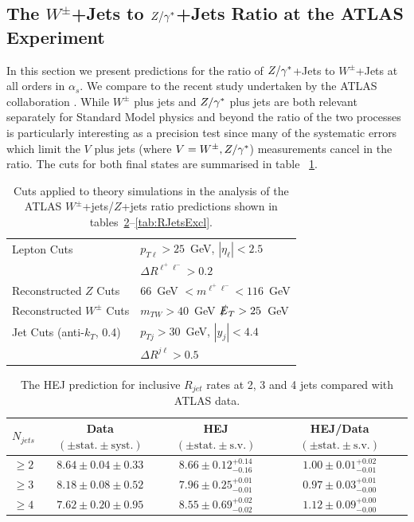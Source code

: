 	\subsection{The $W^\pm$+Jets to $Z/\gamma^*$+Jets Ratio at the ATLAS Experiment}
		\label{sub:ATLASZsec}

		In this section we present predictions for the ratio of $Z/\gamma^*$+Jets to
		$W^\pm$+Jets at all orders in $\alpha_s$.  We compare to the recent study undertaken
		by the ATLAS collaboration \cite{Aad:2014rta}.  While $W^\pm$ plus jets and $Z/\gamma^*$ plus
		jets are both relevant separately for Standard Model physics and beyond the ratio of
		the two processes is particularly interesting as a precision test since many of the
		systematic errors which limit the $V$ plus jets (where $V=W^\pm, Z/\gamma^*$) measurements
		cancel in the ratio.  The cuts for both final states are summarised in table ~\ref{tab:atlasWZcuts}.

		\begin{table}[h]
		\centering
		\begin{tabular}{|l|l|}
			\hline
			Lepton Cuts & $p_{T\ell}>25$~GeV, \; $|\eta_\ell|<2.5$ \\
			&  $\Delta R^{\ell^+\ell^-} > 0.2$ \\ \hline
			Reconstructed $Z$ Cuts &  $66$~GeV $< m^{\ell^+\ell^-} <116$~GeV \\
			\hline
			Reconstructed $W^\pm$ Cuts & $m_{TW} > 40$~GeV\; $\slashed E_{T} > 25$~GeV \\ \hline
			Jet Cuts (anti-$k_T$, 0.4) & $p_{Tj}>30$~GeV, \; $|y_j|<4.4$ \\
			& $\Delta R^{j\ell} >0.5$ \\
			\hline
			\end{tabular}
			\caption{Cuts applied to theory simulations in the analysis of the ATLAS $W^\pm$+jets/$Z$+jets ratio
		  	predictions shown in tables~\ref{tab:RJetsIncl}--\ref{tab:RJetsExcl}.}
			\label{tab:atlasWZcuts}
		\end{table}

		\begin{table}[!h]
			\begin{center}
			\begin{tabular}{| c | c | c | c |}
		        \hline
			$N_{jets}$ & Data $(\pm \text{stat.}\pm \text{syst.})$ & HEJ $(\pm \text{stat.}\pm \text{s.v.})$ & HEJ/Data $(\pm \text{stat.}\pm \text{s.v.})$ \\ \hline
			$\ge2$ & $8.64\pm0.04\pm0.33$ & $8.66\pm0.12^{+0.14}_{-0.16}$ & $1.00\pm0.01^{+0.02}_{-0.01}$ \\ \hline
			$\ge3$ & $8.18\pm0.08\pm0.52$ & $7.96\pm0.25^{+0.01}_{-0.01}$ & $0.97\pm0.03^{+0.01}_{-0.00}$ \\ \hline
			$\ge4$ & $7.62\pm0.20\pm0.95$ & $8.55\pm0.69^{+0.02}_{-0.02}$ & $1.12\pm0.09^{+0.00}_{-0.00}$ \\ \hline
			\end{tabular}
			\caption{The HEJ prediction for inclusive $R_{jet}$ rates at 2, 3 and 4 jets compared with ATLAS data.}
			\label{tab:RJetsIncl}
			\end{center}
		\end{table}

